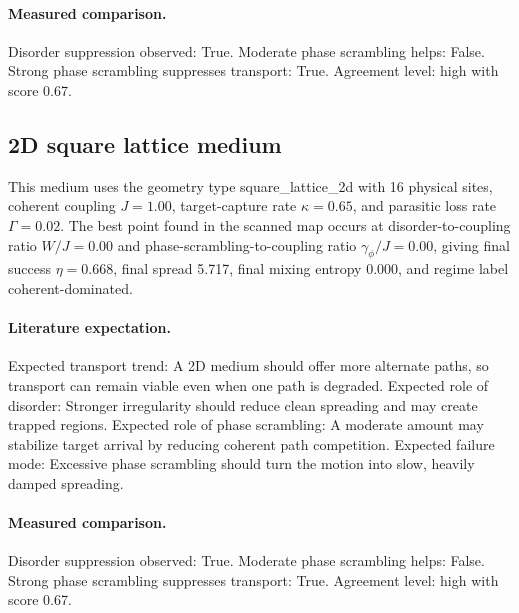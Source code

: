 \paragraph{Measured comparison.}
Disorder suppression observed: True. Moderate phase scrambling helps: False. Strong phase scrambling suppresses transport: True. Agreement level: high with score 0.67.

\subsection{2D square lattice medium}
This medium uses the geometry type square\_lattice\_2d with 16 physical sites, coherent coupling $J=1.00$, target-capture rate $\kappa=0.65$, and parasitic loss rate $\Gamma=0.02$.
The best point found in the scanned map occurs at disorder-to-coupling ratio $W/J=0.00$ and phase-scrambling-to-coupling ratio $\gamma_\phi/J=0.00$, giving final success $\eta=0.668$, final spread 5.717, final mixing entropy 0.000, and regime label coherent-dominated.
\paragraph{Literature expectation.}
Expected transport trend: A 2D medium should offer more alternate paths, so transport can remain viable even when one path is degraded. Expected role of disorder: Stronger irregularity should reduce clean spreading and may create trapped regions. Expected role of phase scrambling: A moderate amount may stabilize target arrival by reducing coherent path competition. Expected failure mode: Excessive phase scrambling should turn the motion into slow, heavily damped spreading.
\paragraph{Measured comparison.}
Disorder suppression observed: True. Moderate phase scrambling helps: False. Strong phase scrambling suppresses transport: True. Agreement level: high with score 0.67.

